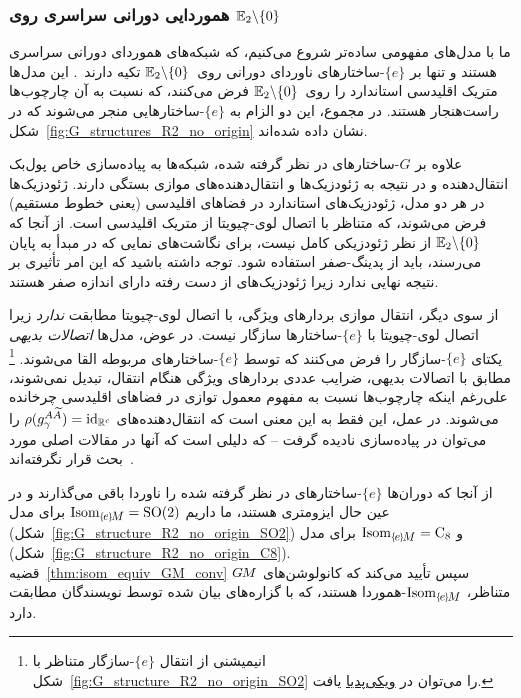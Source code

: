 

\subsubsection*{هموردایی دورانی سراسری روی $\mathbb{E}_2 \backslash \{0\}$}
\label{sec:polar_Euc2_rot}

ما با مدل‌های مفهومی ساده‌تر شروع می‌کنیم، که شبکه‌های هموردای دورانی سراسری هستند و تنها بر $\{e\}$-ساختارهای ناوردای دورانی روی~$\mathbb{E}_2 \backslash \{0\}$ تکیه دارند~\cite{finzi2020generalizing,chidester2019rotation}.
این مدل‌ها متریک اقلیدسی استاندارد را روی~$\mathbb{E}_2 \backslash \{0\}$ فرض می‌کنند، که نسبت به آن چارچوب‌ها راست‌هنجار هستند.
در مجموع، این دو الزام به $\{e\}$-ساختارهایی منجر می‌شوند که در شکل~\ref{fig:G_structures_R2_no_origin} نشان داده شده‌اند.

علاوه بر $G$-ساختارهای در نظر گرفته شده، شبکه‌ها به پیاده‌سازی خاص پول‌بک انتقال‌دهنده و در نتیجه به ژئودزیک‌ها و انتقال‌دهنده‌های موازی بستگی دارند.
ژئودزیک‌ها در هر دو مدل، ژئودزیک‌های استاندارد در فضاهای اقلیدسی (یعنی خطوط مستقیم) فرض می‌شوند، که متناظر با اتصال لوی-چیویتا از متریک اقلیدسی است.
از آنجا که $\mathbb{E}_2 \backslash \{0\}$ از نظر ژئودزیکی کامل نیست، برای نگاشت‌های نمایی که در مبدأ به پایان می‌رسند، باید از پدینگ-صفر استفاده شود.
توجه داشته باشید که این امر تأثیری بر نتیجه نهایی ندارد زیرا ژئودزیک‌های از دست رفته دارای اندازه صفر هستند.


از سوی دیگر، انتقال موازی بردارهای ویژگی، با اتصال لوی-چیویتا مطابقت \emph{ندارد} زیرا اتصال لوی-چیویتا با $\{e\}$-ساختارها سازگار نیست.
در عوض، مدل‌ها \emph{اتصالات بدیهی} یکتای $\{e\}$-سازگار را فرض می‌کنند که توسط $\{e\}$-ساختارهای مربوطه القا می‌شوند.%
\footnote{
\label{footnote:punctured_Euclidean_transport}
	انیمیشنی از انتقال $\{e\}$-سازگار متناظر با شکل~\ref{fig:G_structure_R2_no_origin_SO2} را می‌توان در
	\href{https://en.wikipedia.org/wiki/Levi-Civita_connection\#Parallel_transport}{\underline{ویکی‌پدیا}} یافت.
}
مطابق با اتصالات بدیهی، ضرایب عددی بردارهای ویژگی هنگام انتقال، تبدیل نمی‌شوند، علی‌رغم اینکه چارچوب‌ها نسبت به مفهوم معمول توازی در فضاهای اقلیدسی چرخانده می‌شوند.
در عمل، این فقط به این معنی است که انتقال‌دهنده‌های $\rho(g^{A\widetilde{A}}_\gamma) = \mathrm{id}_{\mathbb{R}^c}$ را می‌توان در پیاده‌سازی نادیده گرفت -- که دلیلی است که آنها در مقالات اصلی مورد بحث قرار نگرفته‌اند~\cite{finzi2020generalizing,chidester2019rotation}.


از آنجا که دوران‌ها $\{e\}$-ساختارهای در نظر گرفته شده را ناوردا باقی می‌گذارند و در عین حال ایزومتری هستند، ما داریم
$\IsomeM = \SO2$ برای مدل \citet{finzi2020generalizing} (شکل~\ref{fig:G_structure_R2_no_origin_SO2}) و
$\IsomeM = \operatorname{C}_8$ برای مدل \citet{chidester2019rotation} (شکل~\ref{fig:G_structure_R2_no_origin_C8}).
قضیه~\ref{thm:isom_equiv_GM_conv} سپس تأیید می‌کند که کانولوشن‌های $G\mkern-1.4muM$ متناظر، $\IsomeM$-هموردا هستند، که با گزاره‌های بیان شده توسط نویسندگان مطابقت دارد.

